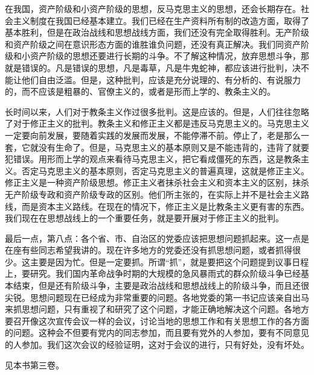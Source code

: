 在我国，资产阶级和小资产阶级的思想，反马克思主义的思想，还会长期存在。社会主义制度在我国已经基本建立。我们已经在生产资料所有制的改造方面，取得了基本胜利，但是在政治战线和思想战线方面，我们还没有完全取得胜利。无产阶级和资产阶级之间在意识形态方面的谁胜谁负问题，还没有真正解决。我们同资产阶级和小资产阶级的思想还要进行长期的斗争。不了解这种情况，放弃思想斗争，那就是错误的。凡是错误的思想，凡是毒草，凡是牛鬼蛇神，都应该进行批判，决不能让他们自由泛滥。但是，这种批判，应该是充分说理的、有分析的、有说服力的，而不应该是粗暴的、官僚主义的，或者是形而上学的、教条主义的。

长时间以来，人们对于教条主义作过很多批判。这是应该的。但是，人们往往忽略了对于修正主义的批判。教条主义和修正主义都是违反马克思主义的。马克思主义一定要向前发展，要随着实践的发展而发展，不能停滞不前。停止了，老是那么一套，它就没有生命了。但是，马克思主义的基本原则又是不能违背的，违背了就要犯错误。用形而上学的观点来看待马克思主义，把它看成僵死的东西，这是教条主义。否定马克思主义的基本原则，否定马克思主义的普遍真理，这就是修正主义。修正主义是一种资产阶级思想。修正主义者抹杀社会主义和资本主义的区别，抹杀无产阶级专政和资产阶级专政的区别。他们所主张的，在实际上并不是社会主义路线，而是资本主义路线。在现在的情况下，修正主义是比教条主义更有害的东西。我们现在在思想战线上的一个重要任务，就是要开展对于修正主义的批判。

最后一点，第八点：各个省、市、自治区的党委应该把思想问题抓起来。这一点是在座有些同志希望我讲的。现在许多地方的党委还没有抓思想问题，或者抓得很少。这主要是因为忙。但是一定要抓。所谓“抓”，就是要把这个问题提到议事日程上，要研究。我们国内革命战争时期的大规模的急风暴雨式的群众阶级斗争已经基本结束，但是还有阶级斗争，主要是政治战线和思想战线上的阶级斗争，而且还很尖锐。思想问题现在已经成为非常重要的问题。各地党委的第一书记应该亲自出马来抓思想问题，只有重视了和研究了这个问题，才能正确地解决这个问题。各地方要召开像这次宣传会议一样的会议，讨论当地的思想工作和有关思想工作的各方面的问题。这种会不但要有党内的同志参加，而且要有党外的人参加，要有不同意见的人参加。我们这次会议的经验证明，这对于会议的进行，只有好处，没有坏处。


\begin{maonote}
见本书第三卷。
\end{maonote}
